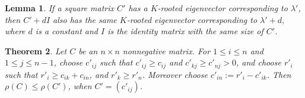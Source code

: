 \documentclass[12pt, a4paper]{article}
\theoremstyle{plain}
\newtheorem{thm}{Theorem}[section]
\newtheorem{lem}[thm]{Lemma}
\theoremstyle{definition}
\begin{document}
\begin{lem}\label{l_diag}   %
If a square matrix $C'$ has a $K$-rooted eigenvector corresponding to $\lambda'$, then $C'+dI$ also has
the same $K$-rooted eigenvector corresponding to $\lambda'+d,$ where $d$ is a constant and $I$ is the identity matrix with the same size of $C'$.
\end{lem}

\begin{thm}\label{thm:conclusion}
    Let $C$ be an $n\times n$ nonnegative matrix. For $1\leq i \leq n$ and $1\leq j\leq n-1$, choose $c'_{ij}$
    such that $c'_{ij}\geq c_{ij}$ and $c'_{kj}\geq c'_{nj}>0$, and choose $r'_i$ such that $r'_i\geq c_{ik}+c_{in}$, and
    $r'_k \geq r'_n$. Moreover choose $c'_{in}:=r'_i-c'_{ik}$. Then $\rho(C)\leq \rho(C')$, when $C'=(c'_{ij})$.
\end{thm}
\end{document}
